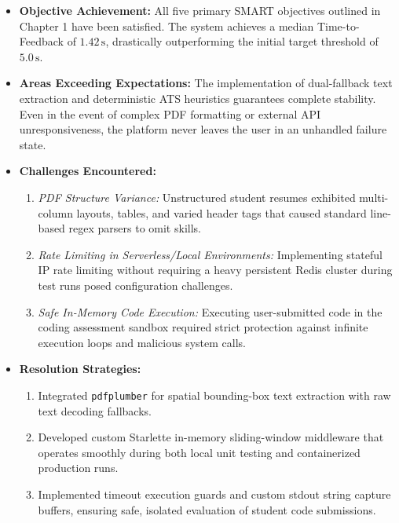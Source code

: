 \documentclass[12pt,a4paper,oneside]{report}
\begin{document}
\begin{itemize}[leftmargin=0.8cm]
    \item \textbf{Objective Achievement:} All five primary SMART objectives outlined in Chapter 1 have been satisfied. The system achieves a median Time-to-Feedback of $1.42\,\text{s}$, drastically outperforming the initial target threshold of $5.0\,\text{s}$.
    \item \textbf{Areas Exceeding Expectations:} The implementation of dual-fallback text extraction and deterministic ATS heuristics guarantees complete stability. Even in the event of complex PDF formatting or external API unresponsiveness, the platform never leaves the user in an unhandled failure state.
    \item \textbf{Challenges Encountered:}
    \begin{enumerate}
        \item \textit{PDF Structure Variance:} Unstructured student resumes exhibited multi-column layouts, tables, and varied header tags that caused standard line-based regex parsers to omit skills.
        \item \textit{Rate Limiting in Serverless/Local Environments:} Implementing stateful IP rate limiting without requiring a heavy persistent Redis cluster during test runs posed configuration challenges.
        \item \textit{Safe In-Memory Code Execution:} Executing user-submitted code in the coding assessment sandbox required strict protection against infinite execution loops and malicious system calls.
    \end{enumerate}
    \item \textbf{Resolution Strategies:}
    \begin{enumerate}
        \item Integrated \texttt{pdfplumber} for spatial bounding-box text extraction with raw text decoding fallbacks.
        \item Developed custom Starlette in-memory sliding-window middleware that operates smoothly during both local unit testing and containerized production runs.
        \item Implemented timeout execution guards and custom stdout string capture buffers, ensuring safe, isolated evaluation of student code submissions.
    \end{enumerate}
\end{itemize}

\newpage
\thispagestyle{empty}
\hbox{}
\thispagestyle{empty}
\newpage
\end{document}
